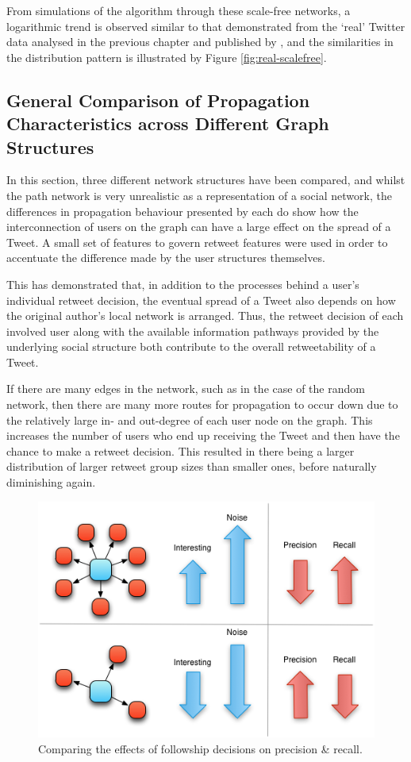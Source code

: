 From simulations of the algorithm through these scale-free networks, a logarithmic trend is observed similar to that demonstrated from the `real' Twitter data analysed in the previous chapter and published by \citet{webberley11}, and the similarities in the distribution pattern is illustrated by Figure \ref{fig:real-scalefree}.


\subsection{General Comparison of Propagation Characteristics across Different Graph Structures}
In this section, three different network structures have been compared, and whilst the path network is very unrealistic as a representation of a social network, the differences in propagation behaviour presented by each do show how the interconnection of users on the graph can have a large effect on the spread of a Tweet. A small set of features to govern retweet features were used in order to accentuate the difference made by the user structures themselves.

This has demonstrated that, in addition to the processes behind a user's individual retweet decision, the eventual spread of a Tweet also depends on how the original author's local network is arranged. Thus, the retweet decision of each involved user along with the available information pathways provided by the underlying social structure both contribute to the overall retweetability of a Tweet. 

If there are many edges in the network, such as in the case of the random network, then there are many more routes for propagation to occur down due to the relatively large in- and out-degree of each user node on the graph. This increases the number of users who end up receiving the Tweet and then have the chance to make a retweet decision. This resulted in there being a larger distribution of larger retweet group sizes than smaller ones, before naturally diminishing again. 

\begin{figure}[h]
\centering
\includegraphics[scale=0.8]{4.Chapter2/Media/precision_recall.png} 
\caption{Comparing the effects of followship decisions on precision \& recall.}
\label{fig:precision_recall}
\end{figure}


